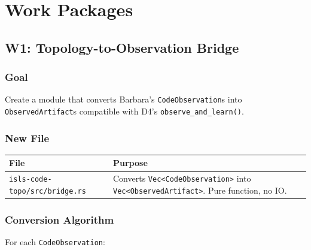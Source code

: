 \documentclass[11pt,a4paper]{article}
\begin{document}
\section{Work Packages}

\subsection{W1: Topology-to-Observation Bridge}
\label{sec:w1}

\subsubsection{Goal}

Create a module that converts Barbara's \texttt{CodeObservation}s into
\texttt{ObservedArtifact}s compatible with D4's \texttt{observe\_and\_learn()}.

\subsubsection{New File}

\begin{longtable}{lp{10cm}}
\toprule
\textbf{File} & \textbf{Purpose} \\
\midrule
\texttt{isls-code-topo/src/bridge.rs}
  & Converts \texttt{Vec<CodeObservation>} into
    \texttt{Vec<ObservedArtifact>}. Pure function, no IO. \\
\bottomrule
\end{longtable}

\subsubsection{Conversion Algorithm}

For each \texttt{CodeObservation}:
\end{document}
